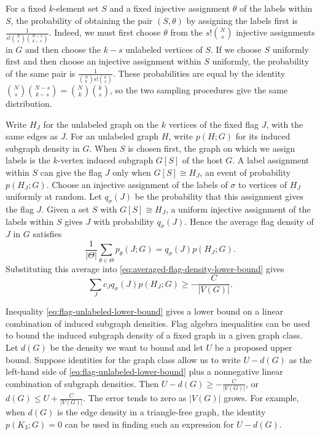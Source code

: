 \documentclass[preprint,11pt,numbers]{elsarticle-arxiv}
\numberwithin{equation}{section}
\theoremstyle{definition}
\begin{document}
For a fixed $k$-element set $S$ and a fixed injective assignment
$\theta$ of the labels within $S$, the probability of obtaining
the pair $(S,\theta)$ by assigning the labels first is
$\frac{1}{s!\binom{N}{s}\binom{N-s}{k-s}}$. Indeed, we must first
choose $\theta$ from the $s!\binom{N}{s}$ injective assignments
in $G$ and then choose the $k-s$ unlabeled vertices of $S$.
If we choose $S$ uniformly first and then choose an injective
assignment within $S$ uniformly, the probability of the same pair
is $\frac{1}{\binom{N}{k}s!\binom{k}{s}}$. These probabilities are
equal by the identity
$\binom{N}{s}\binom{N-s}{k-s}=\binom{N}{k}\binom{k}{s}$,
so the two sampling procedures give the same distribution.

Write $H_J$ for the unlabeled graph on the $k$ vertices of the
fixed flag $J$, with the same edges as $J$. For an unlabeled
graph $H$, write $p(H;G)$ for its induced subgraph density in $G$.
When $S$ is chosen first, the graph on which we assign labels is
the $k$-vertex induced subgraph $G[S]$ of the host $G$. A label
assignment within $S$ can give the flag $J$ only when
$G[S]\cong H_J$, an event of probability $p(H_J;G)$.
Choose an injective assignment of the labels of $\sigma$ to
vertices of $H_J$ uniformly at random. Let $q_\sigma(J)$ be the
probability that this assignment gives the flag $J$. Given a set
$S$ with $G[S]\cong H_J$, a uniform injective assignment of the
labels within $S$ gives $J$ with probability $q_\sigma(J)$. Hence
the average flag density of $J$ in $G$ satisfies
\[
  \frac{1}{|\Theta|}\sum_{\theta\in\Theta}p_\theta(J;G)
    =q_\sigma(J)p(H_J;G).
\]
Substituting this average into
\eqref{eq:averaged-flag-density-lower-bound} gives
\begin{equation}\label{eq:flag-unlabeled-lower-bound}
  \sum_J c_Jq_\sigma(J)p(H_J;G)
    \geq -\frac{C}{|V(G)|}.
\end{equation}

Inequality \eqref{eq:flag-unlabeled-lower-bound} gives a lower
bound on a linear combination of induced subgraph densities.
Flag algebra inequalities can be used to bound the induced
subgraph density of a fixed graph in a given graph class.
Let $d(G)$ be the density we want to bound and let $U$ be a
proposed upper bound. Suppose
identities for the graph class allow us to write $U-d(G)$ as
the left-hand side of \eqref{eq:flag-unlabeled-lower-bound}
plus a nonnegative linear combination of subgraph densities. Then
$U-d(G)\geq-\frac{C}{|V(G)|}$, or
$d(G)\leq U+\frac{C}{|V(G)|}$. The error tends to zero as
$|V(G)|$ grows. For example, when $d(G)$ is the edge density
in a triangle-free graph, the identity $p(K_3;G)=0$ can be
used in finding such an expression for $U-d(G)$.
\end{document}
